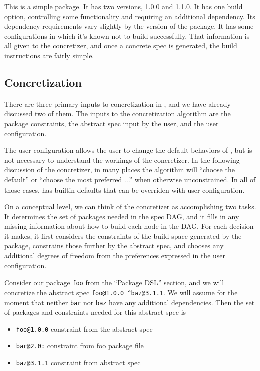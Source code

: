 This is a simple package.
It has two versions, 1.0.0 and 1.1.0.
It has one build option, controlling some functionality and requiring an additional dependency.
Its dependency requirements vary slightly by the version of the package.
It has some configurations in which it's known not to build successfully.
That information is all given to the concretizer, and once a concrete spec is generated, the build instructions are fairly simple.

\subsection{Concretization}

There are three primary inputs to concretization in \spack, and we have already discussed two of them.
The inputs to the concretization algorithm are the package constraints, the abstract spec input by the user, and the user configuration.

The user configuration allows the user to change the default behaviors of \spack, but is not necessary to understand the workings of the concretizer.
In the following discussion of the concretizer, in many places the algorithm will ``choose the default'' or ``choose the most preferred ...'' when otherwise unconstrained.
In all of those cases, \spack has builtin defaults that can be overriden with user configuration.

On a conceptual level, we can think of the concretizer as accomplishing two tasks.
It determines the set of packages needed in the spec DAG, and it fills in any missing information about how to build each node in the DAG.
For each decision it makes, it first considers the constraints of the build space generated by the package, constrains those further by the abstract spec, and chooses any additional degrees of freedom from the preferences expressed in the user configuration.

Consider our package \texttt{foo} from the  ``Package DSL'' section, and we will concretize the abstract spec \texttt{foo@1.0.0 \^{}baz@3.1.1}.
We will assume for the moment that neither \texttt{bar} nor \texttt{baz} have any additional dependencies.
Then the set of packages and constraints needed for this abstract spec is

\begin{itemize}
\item \texttt{foo@1.0.0} constraint from the abstract spec \\
\item \texttt{bar@2.0:} constraint from foo package file \\
\item \texttt{baz@3.1.1} constraint from abstract spec \\
\end{itemize}

